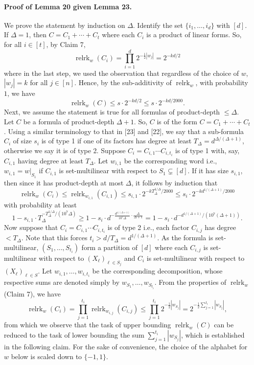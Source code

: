 \paragraph{Proof of Lemma 20 given Lemma 23.} We prove the statement by induction on $\Delta$. Identify the set $\{i_1,\ldots,i_d\}$ with $[d]$.
If $\Delta=1$, then $C=C_1+\cdots+C_t$ where each $C_i$ is a product of linear forms. So, for all $i\in[t]$, by Claim 7,
\[\operatorname{relrk}_w(C_i)=\prod_{i=1}^d2^{-\frac12|w_j|}=2^{-kd/2}\]
where in the last step, we used the observation that regardless of the choice of $w$, $|w_j|=k$ for all $j\in[n]$. Hence, by the sub-additivity of $\operatorname{relrk}_w$, with probability $1$, we have
\[\operatorname{relrk}_w(C)\leq s\cdot2^{-kd/2}\leq s\cdot2^{-kd/2000}.\]
Next, we assume the statement is true for all formulas of product-depth $\leq\Delta$. Let $C$ be a formula of product-depth $\Delta+1$. So, $C$ is of the form $C=C_1+\cdots+C_t$. Using a similar terminology to that in [23] and [22], we say that a sub-formula $C_i$ of size $s_i$ is of type 1 if one of its factors has degree at least $T_\Delta=d^{\Delta/(\Delta+1)}$, otherwise we say it is of type 2.
Suppose $C_i=C_{i,1}\cdots C_{i,t_i}$ is of type 1 with, say, $C_{i,1}$ having degree at least $T_\Delta$. Let $w_{i,1}$ be the corresponding word i.e., $w_{i,1}=w|_{S_1}$ if $C_{i,1}$ is set-multilinear with respect to $S_1\subsetneq[d]$. If it has size $s_{i,1}$, then since it has product-depth at most $\Delta$, it follows by induction that
\[\operatorname{relrk}_w(C_i)\leq\operatorname{relrk}_{w_{i,1}}(C_{i,1})\leq s_{i,1}\cdot2^{-kT_\Delta^{1/\Delta}/2000}\leq s_i\cdot2^{-kd^{1/(\Delta+1)}/2000}\]
with probability at least
\[1-s_{i,1}\cdot T_\Delta^{-T_\Delta^{1/\Delta}/(10^7\Delta)}\geq1-s_i\cdot d^{-\frac{d^{1/(\Delta+1)}}{10^7\Delta}\cdot\frac{\Delta}{\Delta+1}}=1-s_i\cdot d^{-d^{1/(\Delta+1)}/(10^7(\Delta+1))}.\]
Now suppose that $C_i=C_{i,1}\cdots C_{i,t_i}$ is of type 2 i.e., each factor $C_{i,j}$ has degree $<T_\Delta$. Note that this forces $t_i>d/T_\Delta=d^{1/(\Delta+1)}$. As the formula is set-multilinear, $(S_1,\ldots,S_{t_i})$ form a partition of $[d]$ where each $C_{i,j}$ is set-multilinear with respect to $(X_\ell)_{\ell\in S_j}$ and $C_i$ is set-multilinear with respect to $(X_\ell)_{\ell\in S}$. Let $w_{i,1},\ldots,w_{i,t_i}$ be the corresponding decomposition, whose respective sums are denoted simply by $w_{S_1},\ldots,w_{S_{t_i}}$.
From the properties of $\operatorname{relrk}_w$ (Claim 7), we have
\[\operatorname{relrk}_w(C_i)=\prod_{j=1}^{t_i}\operatorname{relrk}_{w_{i,j}}(C_{i,j})\leq\prod_{j=1}^{t_i}2^{-\frac12|w_{S_j}|}=2^{-\frac12\sum_{j=1}^{t_i}|w_{S_j}|},\]
from which we observe that the task of upper bounding $\operatorname{relrk}_w(C)$ can be reduced to the task of lower bounding the sum $\sum_{j=1}^{t_i}|w_{S_j}|$, which is established in the following claim. For the sake of convenience, the choice of the alphabet for $w$ below is scaled down to $\{-1,1\}$.
